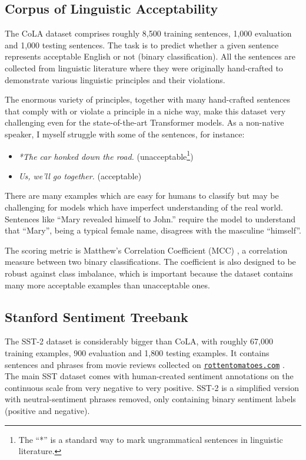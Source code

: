\documentclass[bsc,frontabs,twoside,singlespacing,parskip,deptreport]{infthesis}
\newcommand\rurl[1]{%
  \href{https://#1}{\nolinkurl{#1}}%
}
\begin{document}
{{    \subsection{Corpus of Linguistic Acceptability}{
      \label{sec:datasets-CoLA}

      The CoLA dataset \citep{CoLA-paper} comprises roughly 8,500 training sentences, 1,000 evaluation and 1,000 testing sentences.
      The task is to predict whether a given sentence represents acceptable English or not (binary classification).
      All the sentences are collected from linguistic literature where they were originally hand-crafted to demonstrate various linguistic principles and their violations.
      
      The enormous variety of principles, together with many hand-crafted sentences that comply with or violate a principle in a niche way, make this dataset very challenging even for the state-of-the-art Transformer models. 
      As a non-native speaker, I myself struggle with some of the sentences, for instance:
      \begin{itemize}
        \item \textit{*The car honked down the road.} (unacceptable\footnote{The ``*'' is a standard way to mark ungrammatical sentences in linguistic literature.})
        \item \textit{Us, we'll go together.} (acceptable)
      \end{itemize}

      There are many examples which are easy for humans to classify but may be challenging for models which have imperfect understanding of the real world. Sentences like ``Mary revealed himself to John.'' require the model to understand that ``Mary'', being a typical female name, disagrees with the masculine ``himself''.
      
      The scoring metric is Matthew's Correlation Coefficient (MCC) \citep{Matthews_1975}, a correlation measure between two binary classifications. The coefficient is also designed to be robust against class imbalance, which is important because the dataset contains many more acceptable examples than unacceptable ones.
    }

    \subsection{Stanford Sentiment Treebank}{
      \label{sec:datasets-SST-2}

      The SST-2 dataset \citep{SST-paper} is considerably bigger than CoLA, with roughly 67,000 training examples, 900 evaluation and 1,800 testing examples. It contains sentences and phrases from movie reviews collected on \rurl{rottentomatoes.com}. The main SST dataset comes with human-created sentiment annotations on the continuous scale from very negative to very positive. SST-2 is a simplified version with neutral-sentiment phrases removed, only containing binary sentiment labels (positive and negative).

}}}
\end{document}
